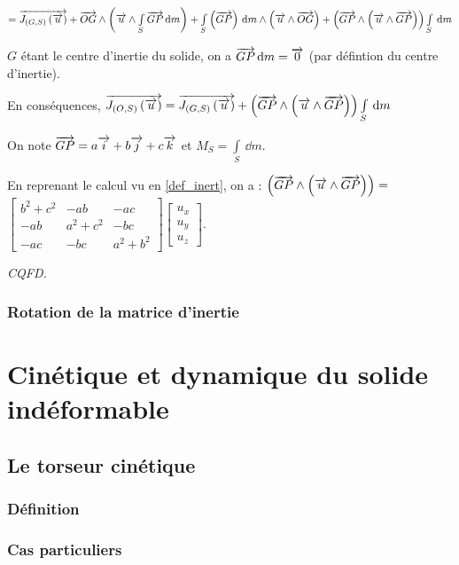 \documentclass[10pt,fleqn]{article} %
\begin{document}
$= \overrightarrow{J_{\left(G,S\right)}\left(\overrightarrow{u}\right)} 
+ \overrightarrow{OG} \wedge \left(\overrightarrow{u}\wedge \int\limits_{S}\overrightarrow{GP} \,\text{d} m\right) 
+\int\limits_{S} \left( \overrightarrow{GP}\right) \,\text{d} m\wedge \left(\overrightarrow{u}\wedge\overrightarrow{OG}\right)
+ \left(\overrightarrow{GP}\wedge \left(\overrightarrow{u}\wedge \overrightarrow{GP} \right) \right) \int\limits_{S}\,\text{d} m
$ 

$G$ étant le centre d'inertie du solide, on a $\overrightarrow{GP} \,\text{d} m=\overrightarrow{0}$ (par défintion du centre d'inertie). 

En conséquences, $ \overrightarrow{J_{\left(O,S\right)}\left(\overrightarrow{u}\right)} = \overrightarrow{J_{\left(G,S\right)}\left(\overrightarrow{u}\right)} 
+ \left(\overrightarrow{GP}\wedge \left(\overrightarrow{u}\wedge \overrightarrow{GP} \right) \right) \int\limits_{S}\,\text{d} m
$ 

On note $\overrightarrow{GP}=a\overrightarrow{i}+b\overrightarrow{j}+c\overrightarrow{k}$ et $M_S=\int\limits_{S}\,\dd m$.

En reprenant le calcul vu en \ref{def_inert}, on a : 
$\left(\overrightarrow{GP}\wedge \left(\overrightarrow{u}\wedge \overrightarrow{GP} \right) \right) = $
$\begin{bmatrix}
 b^2 +  c^2 &  - ab &      -ac   \\
 -ab  & a^2   +c^2   & - bc   \\
  -ac &    -bc  &   a^2 +b^2 
\end{bmatrix}
\begin{bmatrix}
u_x \\ u_y \\ u_z
\end{bmatrix}$. 

\begin{flushright}
\textit{CQFD.}
\end{flushright}


\subsubsection{Rotation de la matrice d'inertie}

\section{Cinétique et dynamique du solide indéformable}
\subsection{Le torseur cinétique}
\subsubsection{Définition}
\subsubsection{Cas particuliers}
\end{document}
